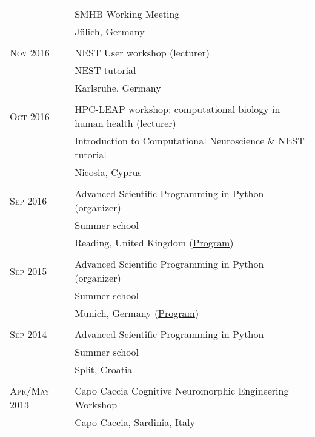 \begin{longtable}{>{\hfill}p{3.3cm}|p{12.0cm}}
                    & \footnotesize SMHB Working Meeting \\
                    & \footnotesize J\"ulich, Germany \\
  \multicolumn{2}{c}{} \\
  \textsc{Nov} 2016 & NEST User workshop (lecturer) \\
  & \footnotesize NEST tutorial \\
  & \footnotesize Karlsruhe, Germany \\
  \multicolumn{2}{c}{} \\
  \textsc{Oct} 2016 & HPC-LEAP workshop: computational biology in human health (lecturer) \\
                    & \footnotesize Introduction to Computational Neuroscience \& NEST tutorial \\
                    & \footnotesize Nicosia, Cyprus \\
  \multicolumn{2}{c}{} \\
  \textsc{Sep} 2016 & Advanced Scientific Programming in Python (organizer)\\
  & \footnotesize Summer school \\
                    &  \footnotesize Reading, United Kingdom (\href{https://python.g-node.org/python-summerschool-2016/schedule.html}{Program}) \\
  \multicolumn{2}{c}{} \\
  \textsc{Sep} 2015 & Advanced Scientific Programming in Python (organizer)\\
  & \footnotesize Summer school \\
  & \footnotesize Munich, Germany (\href{https://python.g-node.org/python-summerschool-2015/schedule.html}{Program})\\
  \multicolumn{2}{c}{} \\
  \textsc{Sep} 2014 & Advanced Scientific Programming in Python \\
  & \footnotesize Summer school \\
  & \footnotesize Split, Croatia \\
  \multicolumn{2}{c}{} \\
  \textsc{Apr}/\textsc{May} 2013 & Capo Caccia Cognitive Neuromorphic Engineering Workshop \\
  & \footnotesize Capo Caccia, Sardinia, Italy
\end{longtable}



